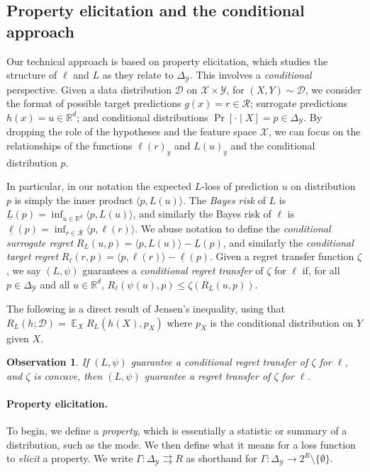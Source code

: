 \documentclass{article}
\newtheorem{observation}{Observation}
\theoremstyle{definition}\newtheorem{definition}{Definition}
\theoremstyle{definition}\newtheorem{assumption}{Assumption}
\newcommand{\reals}{\mathbb{R}}
\newcommand{\simplex}{\Delta_\Y}
\newcommand{\D}{\mathcal{D}}
\DeclareMathOperator{\E}{\mathbb{E}}  %
\newcommand{\R}{\mathcal{R}}
\newcommand{\X}{\mathcal{X}}
\newcommand{\Y}{\mathcal{Y}}
\newcommand{\risk}[1]{\underline{#1}}
\newcommand{\inprod}[2]{\langle #1, #2 \rangle}%
\newcommand{\toto}{\rightrightarrows}
\begin{document}
\subsection{Property elicitation and the conditional approach} \label{subsec:elic}
Our technical approach is based on property elicitation, which studies the structure of $\ell$ and $L$ as they relate to $\simplex$.
This involves a \emph{conditional} perspective.
Given a data distribution $\D$ on $\X \times \Y$, for $(X,Y) \sim \D$, we consider the format of possible target predictions $g(x) = r \in \R$; surrogate predictions $h(x) = u \in \reals^d$; and conditional distributions $\Pr[ \cdot \mid X] = p \in \simplex$.
By dropping the role of the hypotheses and the feature space $\X$, we can focus on the relationships of the functions $\ell(r)_y$ and $L(u)_y$ and the conditional distribution $p$.

In particular, in our notation the expected $L$-loss of prediction $u$ on distribution $p$ is simply the inner product $\inprod{p}{L(u)}$.
The \emph{Bayes risk} of $L$ is $\risk{L}(p) = \inf_{u \in \reals^d} \inprod{p}{L(u)}$, and similarly the Bayes risk of $\ell$ is $\risk{\ell}(p) = \inf_{r \in \R} \inprod{p}{\ell(r)}$.
We abuse notation to define the \emph{conditional surrogate regret} $R_L(u,p) = \inprod{p}{L(u)} - \risk{L}(p)$, and similarly the \emph{conditional target regret} $R_{\ell}(r,p) = \inprod{p}{\ell(r)} - \risk{\ell}(p)$.
Given a regret transfer function $\zeta$, we say $(L,\psi)$ guarantees a \emph{conditional regret transfer} of $\zeta$ for $\ell$ if, for all $p \in \simplex$ and all $u \in \reals^d$, $R_{\ell}(\psi(u),p) \leq \zeta(R_L(u,p))$.

The following is a direct result of Jensen's inequality, using that $R_L(h;\D) = \E_X R_L(h(X),p_X)$ where $p_X$ is the conditional distribution on $Y$ given $X$.
\begin{observation} \label{obs:transfer}
  If $(L,\psi)$ guarantee a conditional regret transfer of $\zeta$ for $\ell$, and $\zeta$ is concave, then $(L,\psi)$ guarantee a regret transfer of $\zeta$ for $\ell$.
\end{observation}
 
\paragraph{Property elicitation.}
To begin, we define a \emph{property}, which is essentially a statistic or summary of a distribution, such as the mode.
We then define what it means for a loss function to \emph{elicit} a property.
We write $\Gamma: \simplex \toto R$ as shorthand for $\Gamma: \simplex \to 2^{R} \setminus \{\emptyset\}$.
\end{document}
